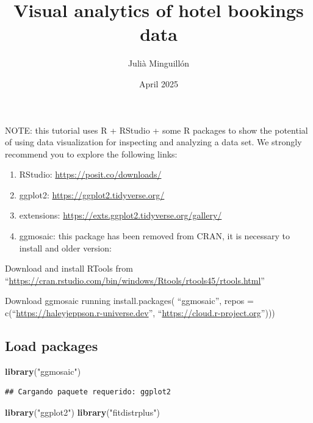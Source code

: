 \documentclass[
]{article}
\title{Visual analytics of hotel bookings data}
\author{Julià Minguillón}
\date{April 2025}
\newenvironment{Shaded}{\begin{snugshade}}{\end{snugshade}}
\newcommand{\FunctionTok}[1]{\textcolor[rgb]{0.13,0.29,0.53}{\textbf{#1}}}
\newcommand{\NormalTok}[1]{#1}
\newcommand{\StringTok}[1]{\textcolor[rgb]{0.31,0.60,0.02}{#1}}
\providecommand{\tightlist}{%
  \setlength{\itemsep}{0pt}\setlength{\parskip}{0pt}}
\begin{document}
\maketitle

NOTE: this tutorial uses R + RStudio + some R packages to show the
potential of using data visualization for inspecting and analyzing a
data set. We strongly recommend you to explore the following links:

\begin{enumerate}
\def\labelenumi{\arabic{enumi})}
\tightlist
\item
  RStudio: \url{https://posit.co/downloads/}
\item
  ggplot2: \url{https://ggplot2.tidyverse.org/}
\item
  extensions: \url{https://exts.ggplot2.tidyverse.org/gallery/}
\item
  ggmosaic: this package has been removed from CRAN, it is necessary to
  install and older version:
\end{enumerate}

Download and install RTools from
``\url{https://cran.rstudio.com/bin/windows/Rtools/rtools45/rtools.html}''

Download ggmosaic running install.packages( ``ggmosaic'', repos =
c(``\url{https://haleyjeppson.r-universe.dev}'',
``\url{https://cloud.r-project.org}'')))

\subsection{Load packages}\label{load-packages}

\begin{Shaded}
\begin{Highlighting}[]
\FunctionTok{library}\NormalTok{(}\StringTok{"ggmosaic"}\NormalTok{)}
\end{Highlighting}
\end{Shaded}

\begin{verbatim}
## Cargando paquete requerido: ggplot2
\end{verbatim}

\begin{Shaded}
\begin{Highlighting}[]
\FunctionTok{library}\NormalTok{(}\StringTok{"ggplot2"}\NormalTok{)}
\FunctionTok{library}\NormalTok{(}\StringTok{"fitdistrplus"}\NormalTok{)}
\end{Highlighting}
\end{Shaded}
\end{document}
